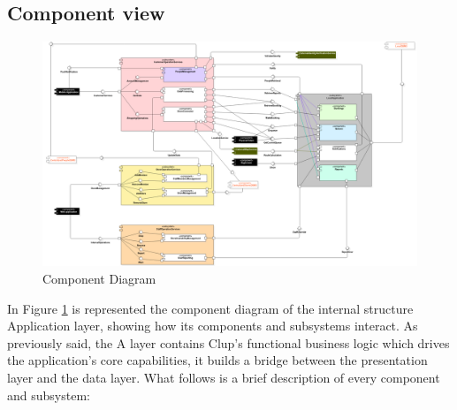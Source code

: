 \subsection{Component view}
\begin{landscape}
\begin{figure}[H]
	\includegraphics[width=\linewidth]{../Diagrams/ComponentDiagram.png}
	\caption{Component Diagram}
	\label{fig:CompDgm}
\end{figure}
\end{landscape}
In Figure \ref{fig:CompDgm} is represented the component diagram of the internal structure Application layer, showing how its components and subsystems interact. As previously said, the A layer contains Clup's functional business logic which drives the application’s core capabilities, it builds  a bridge between the presentation layer and the data layer. What follows is a brief description of every component and subsystem:
